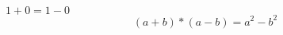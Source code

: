 \documentclass{article}
\newcommand{\test}[2]{#1+#2=#1-#2}
\begin{document}
$\test{1}{0}$
$$
(a+b)*(a-b)=a^2-b^2
$$
\end{document}
